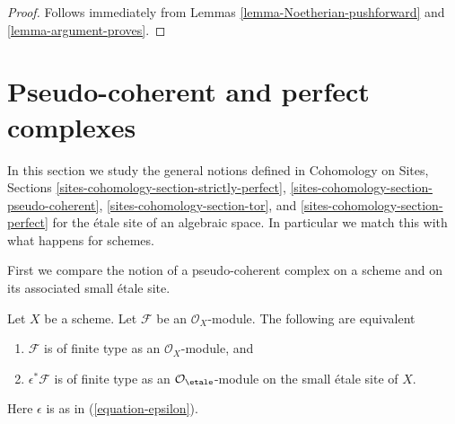 \begin{proof}
Follows immediately from Lemmas \ref{lemma-Noetherian-pushforward} and
\ref{lemma-argument-proves}.
\end{proof}













\section{Pseudo-coherent and perfect complexes}
\label{section-spell-out}

\noindent
In this section we study the general notions defined in
Cohomology on Sites, Sections
\ref{sites-cohomology-section-strictly-perfect},
\ref{sites-cohomology-section-pseudo-coherent},
\ref{sites-cohomology-section-tor}, and
\ref{sites-cohomology-section-perfect}
for the \'etale site of an algebraic space. In particular we
match this with what happens for schemes.

\medskip\noindent
First we compare the notion of a pseudo-coherent complex on a
scheme and on its associated small \'etale site.

\begin{lemma}
\label{lemma-descend-finite-type}
Let $X$ be a scheme. Let $\mathcal{F}$ be an $\mathcal{O}_X$-module.
The following are equivalent
\begin{enumerate}
\item $\mathcal{F}$ is of finite type as an $\mathcal{O}_X$-module, and
\item $\epsilon^*\mathcal{F}$ is of finite type as an
$\mathcal{O}_\etale$-module on the small \'etale site of $X$.
\end{enumerate}
Here $\epsilon$ is as in (\ref{equation-epsilon}).
\end{lemma}

